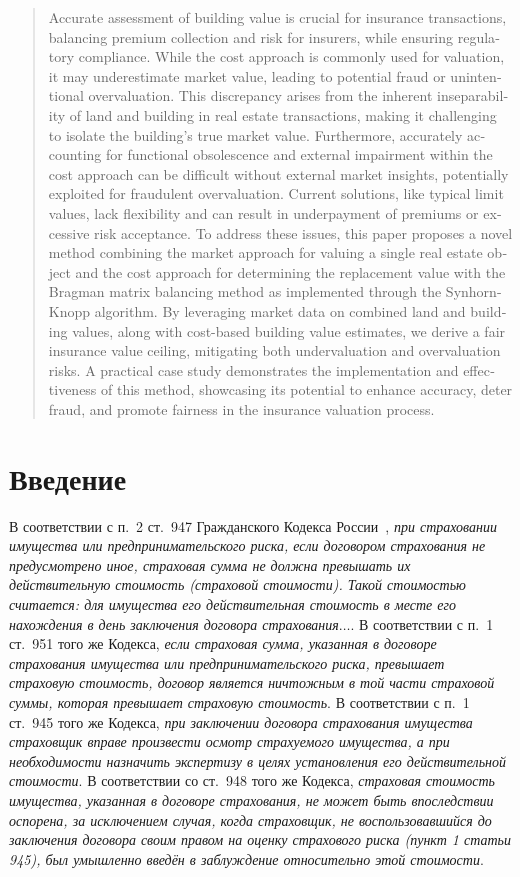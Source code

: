 \documentclass[12pt]{scrartcl}
\begin{document}
\begin{abstract}
\bigskip
\textenglish{Accurate assessment of building value is crucial for insurance transactions, balancing premium collection and risk for insurers, while ensuring regulatory compliance. While the cost approach is commonly used for valuation, it may underestimate market value, leading to potential fraud or unintentional overvaluation. This discrepancy arises from the inherent inseparability of land and building in real estate transactions, making it challenging to isolate the building's true market value. Furthermore, accurately accounting for functional obsolescence and external impairment within the cost approach can be difficult without external market insights, potentially exploited for fraudulent overvaluation. Current solutions, like typical limit values, lack flexibility and can result in underpayment of premiums or excessive risk acceptance. To address these issues, this paper proposes a novel method combining the market approach for valuing a single real estate object and the cost approach for determining the replacement value with the Bragman matrix balancing method as implemented through the Synhorn-Knopp algorithm. By leveraging market data on combined land and building values, along with cost-based building value estimates, we derive a fair insurance value ceiling, mitigating both undervaluation and overvaluation risks. A practical case study demonstrates the implementation and effectiveness of this method, showcasing its potential to enhance accuracy, deter fraud, and promote fairness in the insurance valuation process.}

\end{abstract}

\section{Введение}\label{sec:Introduction}
В соответствии с п.~2 ст.~947 Гражданского Кодекса России~\cite{GKRFP2},\emph{ при страховании имущества или предпринимательского риска, если договором страхования не предусмотрено иное, страховая сумма не должна превышать их действительную стоимость (страховой стоимости). Такой стоимостью считается: для имущества его действительная стоимость в месте его нахождения в день заключения договора страхования}$\ldots$. В соответствии с п.~1 ст.~951 того же Кодекса, \emph{если страховая сумма, указанная в договоре страхования имущества или предпринимательского риска, превышает страховую стоимость, договор является ничтожным в той части страховой суммы, которая превышает страховую стоимость}. В соответствии с п.~1 ст.~945 того же Кодекса, \emph{при заключении договора страхования имущества страховщик вправе произвести осмотр страхуемого имущества, а при необходимости назначить экспертизу в целях установления его действительной стоимости}. В соответствии со ст.~948 того же Кодекса, \emph{страховая стоимость имущества, указанная в договоре страхования, не может быть впоследствии оспорена, за исключением случая, когда страховщик, не воспользовавшийся до заключения договора своим правом на оценку страхового риска (пункт 1 статьи 945), был умышленно введён в заблуждение относительно этой стоимости}.
\end{document}
